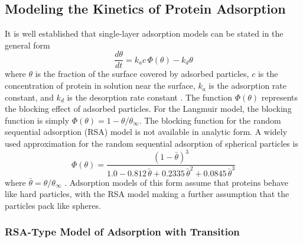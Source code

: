 \subsection{Modeling the Kinetics of Protein Adsorption}

It is well established that single-layer adsorption models can be
stated in the general form\begin{equation}
\frac{d\theta}{dt}=k_{a}c\,\Phi\left(\theta\right)-k_{d}\theta\label{eq:Single Layer Kinetics}\end{equation}
where $\theta$ is the fraction of the surface covered by adsorbed
particles, $c$ is the concentration of protein in solution near the
surface, $k_{a}$ is the adsorption rate constant, and $k_{d}$ is
the desorption rate constant \cite{Andrade1986}. The function $\Phi\left(\theta\right)$
represents the blocking effect of adsorbed particles. For the Langmuir
model, the blocking function is simply $\Phi\left(\theta\right)=1-\theta/\theta_{\infty}$.
The blocking function for the random sequential adsorption (RSA) model
is not available in analytic form. A widely used approximation for
the random sequential adsorption of spherical particles is\begin{equation}
\Phi\left(\theta\right)=\frac{\left(1-\bar{\theta}\right)^{3}}{1.0-0.812\bar{\,\theta}+0.2335\bar{\,\theta}^{2}+0.0845\bar{\,\theta}^{3}}\label{eq:RSA Blocking Function}\end{equation}
where $\bar{\theta}=\theta/\theta_{\infty}$ \cite{Schaaf1989}. Adsorption
models of this form assume that proteins behave like hard particles,
with the RSA model making a further assumption that the particles
pack like spheres.


\subsubsection{RSA-Type Model of Adsorption with Transition}

